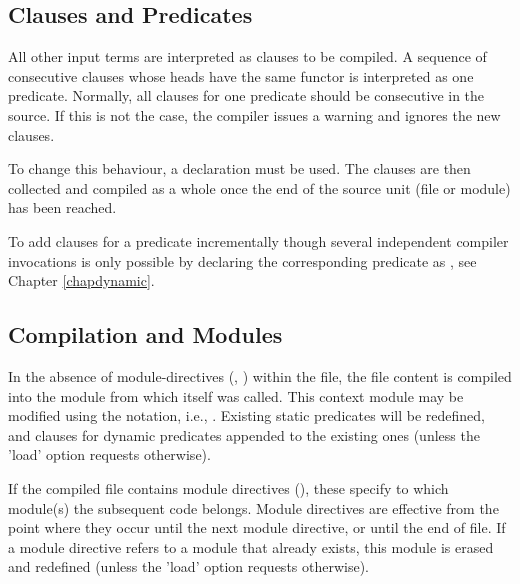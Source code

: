 \subsection{Clauses and Predicates}

All other input terms are interpreted as clauses to be compiled.
A sequence of consecutive clauses whose heads have the same
functor is interpreted as one predicate.  Normally, all clauses for
one predicate should be consecutive in the source.  If this is not the
case, the compiler issues a warning and ignores the new clauses.

To change this behaviour, a
declaration must be used.  The clauses are then collected and compiled
as a whole once the end of the source unit (file or module) has been reached.

To add clauses for a predicate incrementally though several independent
compiler invocations is only possible by declaring the corresponding
predicate as ,
see Chapter \ref{chapdynamic}.


\subsection{Compilation and Modules}

In the absence of module-directives
(,
)
within the file, the
file content is compiled into the module from which 
itself
was called.  This context module may be modified using the 
notation,
i.e., .  Existing static predicates will
be redefined, and clauses for dynamic predicates appended to the
existing ones (unless the 'load' option requests otherwise).

If the compiled file contains module directives (), these
specify to which module(s) the subsequent code belongs.  Module directives
are effective from the point where they occur until the next module
directive, or until the end of file.  If a module directive refers
to a module that already exists, this module is erased and redefined
(unless the 'load' option requests otherwise).

